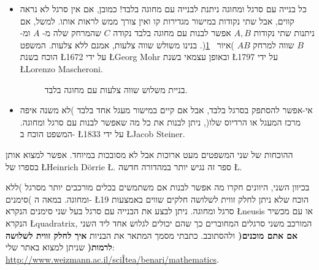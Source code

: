 \documentclass[12pt,a4paper]{article}
\begin{document}
\begin{itemize}
\item
כל בנייה עם סרגל ומחוגה ניתנת לבנייה עם מחוגה בלבד! כמובן, אם אין סרגל לא נראה קווים, אבל שתי נקודות במישור מגדירות קו ואין צורך ממש לראות אותו. למשל, אם ניתנות שתי נקודות
$A,B$
אפשר לבנות עם מחוגה בלבד נקודה
$C$
שהמרחק שלה מ-%
$A$
ומ-%
$B$
שווה למרחק
$AB$
)איור~%
\ref{fig.mm}(.
בנינו משולש שווה צלעות, אמנם ללא צלעות. המשפט הוכח בשנת
\L{1672}
על ידי
\L{Georg Mohr}
ובאופן עצמאי בשנת
\L{1797}
על ידי
\L{Lorenzo Mascheroni}.
\begin{figure}[H]
\begin{center}
\caption{%
בניית משלוש שווה צלעות עם מחוגה בלבד.%
}\label{fig.mm}
\end{center}
\end{figure}
\vspace*{-8ex}
\item
אי-אפשר להסתפק בסרגל בלבד, אבל אם קיים במישור מעגל אחד בלבד )לא משנה איפה מרכז המעגל או הרדיוס שלו(, ניתן לבנות את כל מה שאפשר לבנות עם סרגל ומחוגה. המשפט הוכח ב-%
\L{1833}
על ידי 
\L{Jacob Steiner}.
\end{itemize}
ההוכחות של שני המשפטים מעט ארוכות אבל לא מסובכות במיוחד. אפשר למצוא אותן בספרו של
\L{Heinrich D\"{o}rrie}
\L{\cite{dorrie1}}.
ספר זה נגיש יותר במהדורה חדשה 
\L{\cite{dorrie2}}.

בכיוון השני, היוונים חקרו מה אפשר לבנות אם משתמשים בכלים מורכבים יותר מסרגל )ללא סימנים( ומחוגה. במאה ה-%
\L{19}
הוכח שלא ניתן לחלק זווית לשלושה חלקים שווים באמצעות סרגל ומחוגה. ניתן לבצע את הבנייה עם סרגל בעל שני סימנים הנקרא
\L{neusis}
או עם מכשיר הנקרא
\L{quadratrix},
המורכב משני סרגלים המחוברים כך שהם יכולים לגלוש אחד ליד השני ולהסתובב. כתבתי מסמך המתאר את הבניות
\textbf{איך לחלק זווית לשלושה )אם אתם מוכנים לרמות(}
שניתן למצוא באתר שלי:\\
\url{http://www.weizmann.ac.il/sciÎtea/benari/mathematics}.


\end{document}
